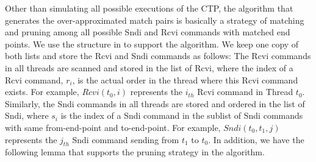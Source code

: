 \begin{comment}
   \begin{tikzpicture}
   \tikzstyle{every node}=[circle,draw]
\node(root) {root}
  child{ node(A) {A}
        child{node(B) {B} child{node(C) {C} child{node(D){D} child{node(L){L}}}}}
        child{node (E) {E}
                child{node(F){F} child{node(G){G} child{node(H){H}}}}
                child{node(I){I} child{node(J){J} child{node(K){K}}}}}};

\tikzstyle{every node}=[->]
\path
(root) edge node[right]{} (A)
(A) edge node[left]{(RcviC, Sndi2)} (B)
    edge node[right]{(RcviA, Sndi1)} (E)
(B) edge node[left]{(RcviA, Sndi3)} (C)
(C) edge node[left]{(RcviB, Sndi1)} (D)
(E) edge node[left]{(RcviC, Sndi2)} (F)
    edge node[right]{(RcviB, Sndi3)} (I)
(F) edge node[left]{(RcviB, Sndi3)} (G)
(I) edge node[right]{(RcviC, Sndi2)} (J);

\end{tikzpicture}
\end{comment}



Other than simulating all possible executions of the CTP, the algorithm that generates the over-approximated match pairs is basically a strategy of matching and pruning among all possible Sndi and Rcvi commands with matched end points. We use the structure in  to support the algorithm. We keep one copy of both lists and store the Rcvi and Sndi commands as follows: The Rcvi commands in all threads are scanned and stored in the list of Rcvi, where the index of a Rcvi command, $r_i$, is the actual order in the thread where this Rcvi command exists. For example, $Rcvi(t_0, i)$ represents the $i_{th}$ Rcvi command in Thread $t_0$. Similarly, the Sndi commands in all threads are stored and ordered in the list of Sndi, where $s_i$ is the index of a Sndi command in the sublist of Sndi commands with same from-end-point and to-end-point. For example, $Sndi(t_0, t_1, j)$ represents the $j_{th}$ Sndi command sending from $t_1$ to $t_0$. In addition, we have the following lemma that supports the pruning strategy in the algorithm.



